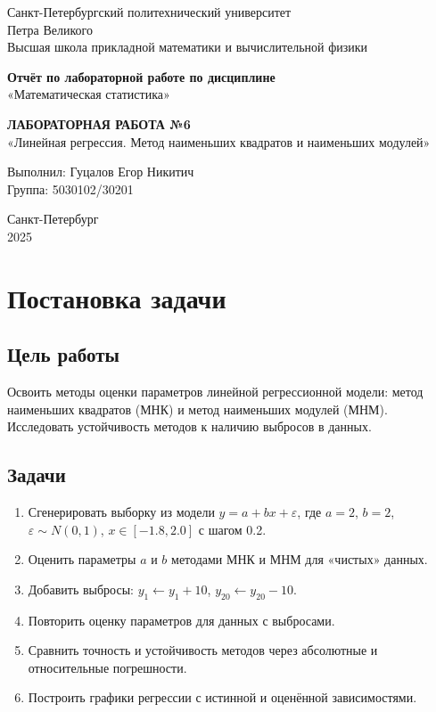 \documentclass[12pt, a4paper]{article}
\begin{document}
\begin{titlepage}
\begin{center}
\large
Санкт-Петербургский политехнический университет \\
Петра Великого \\
Высшая школа прикладной математики и вычислительной физики \\
\vspace{3cm}

\textbf{Отчёт по лабораторной работе по дисциплине} \\
«Математическая статистика» \\
\vspace{0.5cm}

\textbf{ЛАБОРАТОРНАЯ РАБОТА №6} \\
«Линейная регрессия. Метод наименьших квадратов и наименьших модулей» \\
\vspace{2cm}

Выполнил: Гуцалов Егор Никитич \\
Группа: 5030102/30201 \\
\vfill

Санкт-Петербург \\
2025
\end{center}
\end{titlepage}
\section{Постановка задачи}

\subsection{Цель работы}
Освоить методы оценки параметров линейной регрессионной модели: метод наименьших квадратов (МНК) и метод наименьших модулей (МНМ). Исследовать устойчивость методов к наличию выбросов в данных.

\subsection{Задачи}
\begin{enumerate}
    \item Сгенерировать выборку из модели $y = a + bx + \varepsilon$, где $a = 2$, $b = 2$, $\varepsilon \sim N(0, 1)$, $x \in [-1.8, 2.0]$ с шагом 0.2.
    \item Оценить параметры $a$ и $b$ методами МНК и МНМ для «чистых» данных.
    \item Добавить выбросы: $y_1 \leftarrow y_1 + 10$, $y_{20} \leftarrow y_{20} - 10$.
    \item Повторить оценку параметров для данных с выбросами.
    \item Сравнить точность и устойчивость методов через абсолютные и относительные погрешности.
    \item Построить графики регрессии с истинной и оценённой зависимостями.
\end{enumerate}
\end{document}
